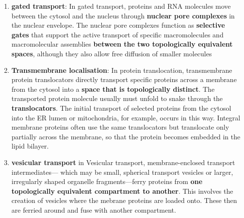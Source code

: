 \documentclass[../main.tex]{subfiles}
\begin{document}
\begin{enumerate}
    \item \textbf{gated transport}: In gated transport, proteins and RNA molecules move between the 
cytosol and the nucleus through \textbf{nuclear pore complexes} in the nuclear envelope. The 
nuclear pore complexes function as \textbf{selective gates} that support the active transport of 
specific macromolecules and macromolecular assemblies \textbf{between the two topologically 
equivalent spaces}, although they also allow free diffusion of smaller molecules

\item \textbf{Transmembrane localisation}: In protein translocation, transmembrane protein 
translocators directly transport specific proteins across a membrane from the cytosol 
into a \textbf{space that is topologically distinct}. The transported protein molecule usually must 
unfold to snake through the \textbf{\gls{translocators}}. The initial transport of selected proteins from 
the cytosol into the ER lumen or mitochondria, for example, occurs in this way. Integral 
membrane proteins often use the same translocators but translocate only partially 
across the membrane, so that the protein becomes embedded in the lipid bilayer.

\item \textbf{vesicular transport} in Vesicular transport, membrane-enclosed transport 
intermediates— which may be small, spherical transport vesicles or larger, irregularly 
shaped organelle fragments—ferry proteins from\textbf{ one topologically equivalent 
compartment to another}. This involves the creation of vesicles where the mebrane proteins are loaded onto. These then are ferried around and fuse with another compartment.

\end{enumerate}
\end{document}
